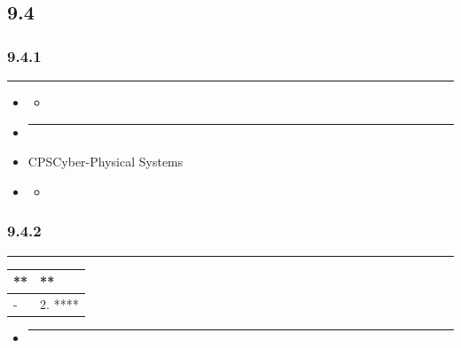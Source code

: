 \subsection{9.4}\label{section-15}

\subsubsection{9.4.1}\label{section-16}

\begin{center}\rule{0.5\linewidth}{0.5pt}\end{center}

\begin{itemize}
\item
  \begin{itemize}
  \tightlist
  \item
  \end{itemize}
\item
  \begin{center}\rule{0.5\linewidth}{0.5pt}\end{center}
\item
  CPSCyber-Physical Systems
\item
  \begin{itemize}
  \tightlist
  \item
  \end{itemize}
\end{itemize}

\subsubsection{9.4.2}\label{section-17}

\begin{center}\rule{0.5\linewidth}{0.5pt}\end{center}

\begin{longtable}[]{@{}ll@{}}
\toprule\noalign{}
** & ** \\
\midrule\noalign{}
\endhead
\bottomrule\noalign{}
\endlastfoot
- & 2. **** \\
\end{longtable}

\begin{itemize}
\item
  \begin{center}\rule{0.5\linewidth}{0.5pt}\end{center}
\end{itemize}

